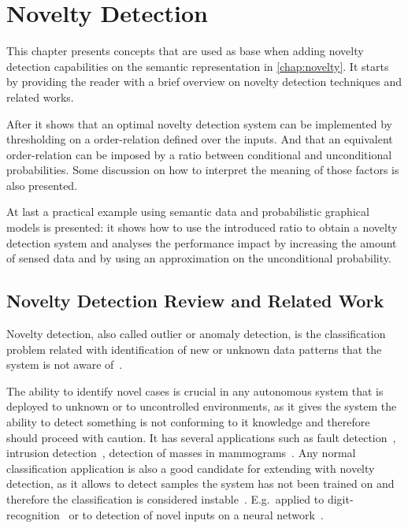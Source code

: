 \chapter{Novelty Detection}\label{chap:novelty-intro}

This chapter presents concepts that are used as base when adding novelty
detection capabilities on the semantic representation in \autoref{chap:novelty}.
It starts by providing the reader with a brief overview on novelty detection
techniques and related works.

After it shows that an optimal novelty detection system can be implemented by
thresholding on a order-relation defined over the inputs.
And that an equivalent order-relation can be imposed by a ratio between
conditional and unconditional probabilities.
Some discussion on how to interpret the meaning of those factors is also
presented.

At last a practical example using semantic data and probabilistic graphical
models is presented: it shows how to use the introduced ratio to obtain a
novelty detection system and analyses the performance impact by increasing
the amount of sensed data and by using an approximation on the unconditional
probability.


\section{Novelty Detection Review and Related Work}
Novelty detection, also called outlier or anomaly detection, is the
classification problem related with identification of new or unknown data
patterns that the system is not aware of~\cite{markou2003novelty}.

The ability to identify novel cases is crucial in any autonomous system
that is deployed to unknown or to uncontrolled environments, as it gives the
system the ability to detect something is not conforming to it knowledge and
therefore should proceed with caution.
It has several applications such as fault detection~\cite{tarassenko1999novelty},
intrusion detection~\cite{fan2001using},
detection of masses in mammograms~\cite{tarassenko1995novelty}.
Any normal classification application is also a good candidate for extending
with novelty detection, as it allows to detect samples the system has not been
trained on and therefore the classification is considered
instable~\cite{devarakota2008reliability}.
E.g.\ applied to digit-recognition~\cite{tax1998outlier}
or to detection of novel inputs on a neural network~\cite{bishop1994novelty}.

